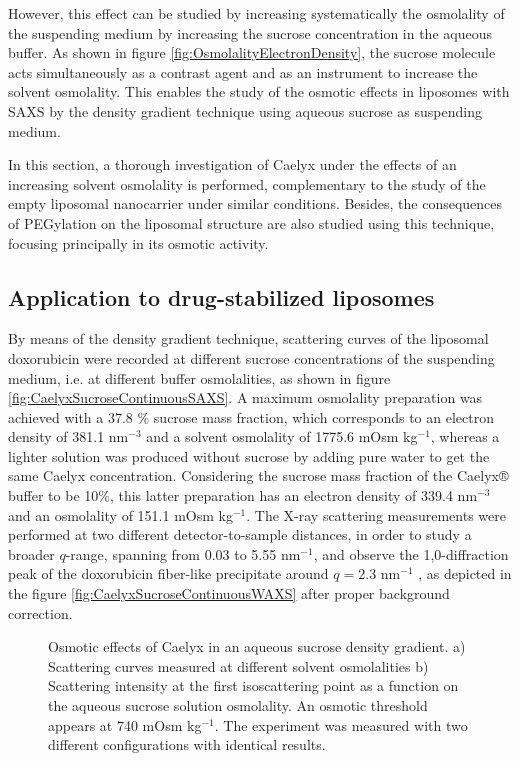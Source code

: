 However, this effect can be studied by increasing systematically the osmolality of the suspending medium by increasing the sucrose concentration in the aqueous buffer. As shown in figure \ref{fig:OsmolalityElectronDensity}, the sucrose molecule acts simultaneously as a contrast agent and as an instrument to increase the solvent osmolality. This enables the study of the osmotic effects in liposomes with SAXS by the density gradient technique using aqueous sucrose as suspending medium. 

In this section, a thorough investigation of Caelyx \textregistered under the effects of an increasing solvent osmolality is performed, complementary to the study of the empty liposomal nanocarrier under similar conditions. Besides, the consequences of PEGylation on the liposomal structure are also studied using this technique, focusing principally in its osmotic activity. 


\subsection{Application to drug-stabilized liposomes}
\label{sec:OsmoticCaelyx}
By means of the density gradient technique, scattering curves of the liposomal doxorubicin were recorded at different sucrose concentrations of the suspending medium, i.e. at different buffer osmolalities, as shown in figure \ref{fig:CaelyxSucroseContinuousSAXS}. A maximum osmolality preparation was achieved with a 37.8 $\%$ sucrose mass fraction, which corresponds to an electron density of 381.1 nm$^{-3}$ and a solvent osmolality of 1775.6 mOsm kg$^{-1}$,  whereas a lighter solution was produced without sucrose by adding pure water to get the same Caelyx \textregistered concentration. Considering the sucrose mass fraction of the Caelyx® buffer to be 10$\%$, this latter preparation has an electron density of 339.4 nm$^{-3}$ and an osmolality of 151.1 mOsm kg$^{-1}$. The X-ray scattering measurements were performed at two different detector-to-sample distances, in order to study a broader $q$-range, spanning from 0.03 to 5.55 nm$^{-1}$, and observe the 1,0-diffraction peak of the doxorubicin fiber-like precipitate around $q=2.3$ nm$^{-1}$ \citep{li_doxorubicin_1998}, as depicted in the figure \ref{fig:CaelyxSucroseContinuousWAXS} after proper background correction.

\begin{figure}
	\centering
		\caption[Osmotic effects of Caelyx in an aqueous sucrose density gradient.]{Osmotic effects of Caelyx \textregistered in an aqueous sucrose density gradient. a) Scattering curves measured at different solvent osmolalities  b) Scattering intensity at the first isoscattering point as a function on the aqueous sucrose solution osmolality. An osmotic threshold appears at 740 mOsm kg$^{-1}$. The experiment was measured with two different configurations with identical results.}
\end{figure}

